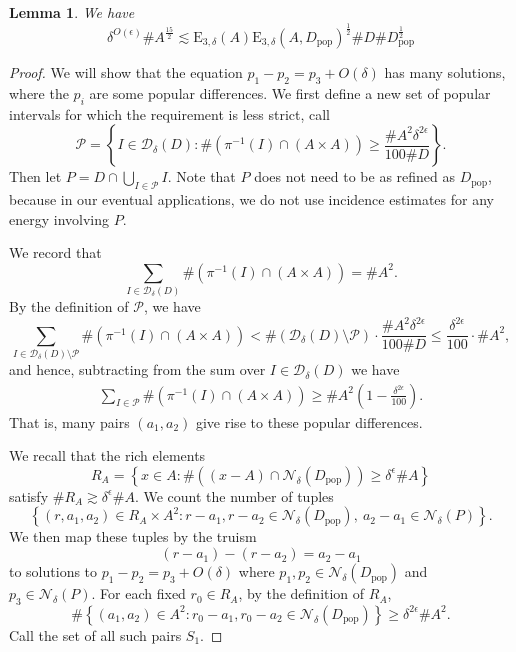\documentclass[12pt]{amsart}
\newtheorem{lemma}[theorem]{Lemma}
\newcommand{\pop}{D_{\mathrm{pop}}}
\newcommand{\1}{\mathbf{1}}
\newcommand{\de}{\delta}
\begin{document}
\begin{lemma}\label{lem.energybound1}
We have
\[
	\delta^{O(\epsilon)} \# A ^{\frac{15}{2} }\lesssim \mathrm{E} _{3,\delta} (A) \mathrm{E} _{3,\delta} (A, \pop )^{\frac{1}{2} } \# D \# \pop ^{\frac{1}{2} } 
\]
\end{lemma}
\begin{proof}
We will show that the equation \(p_1 - p_2 = p_3 + O(\de)\)
has many solutions, where the \(p_i\) are some popular differences.
We first define a new set of popular intervals for which the requirement is less strict, call
\[
	\mathcal{P} = \left\{ I \in \mathcal{D} _{\delta} \left( D \right) : \# \left( \pi ^{-1} (I) \cap \left( A \times A \right)  \right) \geq \frac{\# A ^{2} \delta^{2\epsilon}}{100 \# D}  \right\} 
.\]
Then let \(P = D \cap \bigcup _{I \in \mathcal{P} } I \).
Note that \(P\) does not need to be as refined as \(D _{ \text{pop} } \), because in our eventual applications,
we do not use incidence estimates for any energy involving \(P\).

We record that
\[
	\sum _{I \in \mathcal{D} _{\delta} (D)} \# \left( \pi ^{-1} (I) \cap \left( A \times A \right)  \right) =  \# A ^{2}
.\]
By the definition of \(\mathcal{P} \), we have
\[
	\sum _{I \in \mathcal{D} _{\delta} (D) \setminus \mathcal{P}} \# \left( \pi ^{-1}(I) \cap (A \times A)  \right) < \# \left( \mathcal{D} _{\delta} (D) \setminus \mathcal{P}  \right) \cdot \frac{\# A ^{2} \delta^{2 \epsilon}}{100 \# D} \leq \frac{\delta^{2 \epsilon}}{100} \cdot \# A ^{2}
,\]
and hence, subtracting from the sum over \(I \in \mathcal{D} _{\delta} (D)\) we have 
\begin{align}\label{eq:sum-over-P}
	\sum _{I \in \mathcal{P}  } \# \left( \pi ^{-1}(I) \cap \left( A \times A \right)  \right) \geq  \# A ^{2}\left( 1 - \frac{\delta^{2 \epsilon}}{100}  \right).
\end{align}
That is, many pairs \((a_1,a_2)\) give rise to these popular differences.

We recall that the rich elements
\[
	R_{A}  = \left\{ x \in A : \# \left( (x - A)\cap \mathcal{N} _{\delta} (D_{\text{pop}} ) \right) \geq \delta^{\epsilon} \# A \right\} 
\]
satisfy \(\# R_{A} \gtrsim \delta^{\epsilon} \# A\). We count the number of tuples
\[
	\left\{ (r,a_1,a_2)\in R_{A} \times A ^{2} : r-a_1 , r-a_2 \in \mathcal{N} _{\delta} (D_{\text{pop}} ),~  a_2 - a_1 \in \mathcal{N} _{\delta} (P)   \right\} 
.\]
We then map these tuples by the truism
\[
	(r- a_1) - (r - a_2) = a_2-a_1
\]
to solutions to \(p_1 - p_2 = p_3 + O(\de)\) where \(p_1,p_2 \in \mathcal{N} _{\delta} (D_{\text{pop}} ) \) and \(p_3 \in \mathcal{N} _{\delta} (P) \).
For each fixed \(r_0 \in R_{A} \), by the definition of \(R_{A} \),
\[
	\# \left\{ (a_1,a_2)\in A ^{2} : r_0-a_1, r_0-a_2 \in \mathcal{N} _{\delta} (D_{\text{pop}} ) \right\} \geq \delta^{2 \epsilon}\# A ^{2}
.\]
Call the set of all such pairs \(S_1\). 


\end{proof}
\end{document}
